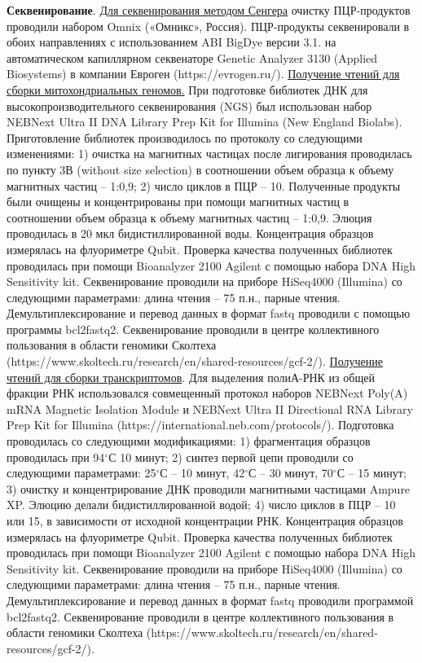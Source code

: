 
\textbf{Секвенирование}. \underline{Для секвенирования методом Сенгера} очистку ПЦР-продуктов проводили набором Omnix («Омникс», Россия). ПЦР-продукты секвенировали в обоих направлениях с использованием ABI BigDye версии 3.1. на автоматическом капиллярном секвенаторе Genetic Analyzer 3130 (Applied Biosystems) в компании Евроген (https://evrogen.ru/). \underline{Получение чтений для сборки митохондриальных геномов.} При подготовке библиотек ДНК для высокопроизводительного секвенирования (NGS) был использован набор NEBNext Ultra II DNA Library Prep Kit for Illumina (New England Biolabs). Приготовление библиотек производилось по протоколу со следующими изменениями: 1)  очистка на магнитных частицах после лигирования проводилась по пункту 3В (without size selection) в соотношении объем образца к объему магнитных частиц -- 1:0,9; 2) число циклов в ПЦР -- 10. Полученные продукты были очищены и концентрированы при помощи магнитных частиц в соотношении объем образца к объему магнитных частиц -- 1:0,9. Элюция проводилась в 20 мкл бидистиллированной воды. Концентрация образцов измерялась на флуориметре Qubit. Проверка качества полученных библиотек проводилась при помощи Bioanalyzer 2100 Agilent с помощью набора DNA High Sensitivity kit. Секвенирование проводили на приборе HiSeq4000 (Illumina) со следующими параметрами: длина чтения -- 75 п.н., парные чтения. Демультиплексирование и перевод данных в формат fastq проводили с помощью программы bcl2fastq2. Секвенирование проводили в центре коллективного пользования в области геномики Сколтеха (https://www.skoltech.ru/research/en/shared-resources/gcf-2/). \underline{Получение чтений для сборки транскриптомов}. Для выделения полиА-РНК из общей фракции РНК использовался совмещенный протокол наборов NEBNext Poly(A) mRNA Magnetic Isolation Module и NEBNext Ultra II Directional RNA Library Prep Kit for Illumina (https://international.neb.com/protocols/). Подготовка проводилась со следующими модификациями:  1) фрагментация образцов проводилась при 94$^\circ$С 10 минут; 2) синтез первой цепи проводили со следующими параметрами: 25$^\circ$С -- 10 минут, 42$^\circ$С -- 30 минут, 70$^\circ$С -- 15 минут; 3) очистку и концентрирование ДНК проводили магнитными частицами Ampure XP. Элюцию делали бидистиллированной водой;  4) число циклов в ПЦР -- 10 или 15, в зависимости от исходной концентрации РНК. Концентрация образцов измерялась на флуориметре Qubit. Проверка качества полученных библиотек проводилась при помощи Bioanalyzer 2100 Agilent с помощью набора DNA High Sensitivity kit. Секвенирование проводили на приборе HiSeq4000 (Illumina) со следующими параметрами: длина чтения -- 75 п.н., парные чтения. Демультиплексирование и перевод данных в формат fastq проводили программой bcl2fastq2. Секвенирование проводили в центре коллективного пользования в области геномики Сколтеха (https://www.skoltech.ru/research/en/shared-resources/gcf-2/).


